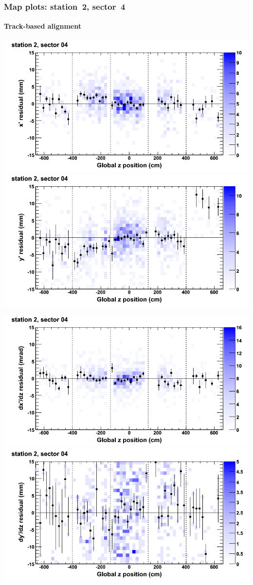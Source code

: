 \documentclass[compress]{beamer}
\begin{document}
\begin{frame}
\frametitle{Map plots: station~2, sector~4}
\framesubtitle{Track-based alignment}
\includegraphics[width=0.5\linewidth]{mapplots_re05/DTvsz_st2sec04_x.png}
\includegraphics[width=0.5\linewidth]{mapplots_re05/DTvsz_st2sec04_y.png}

\includegraphics[width=0.5\linewidth]{mapplots_re05/DTvsz_st2sec04_dxdz.png}
\includegraphics[width=0.5\linewidth]{mapplots_re05/DTvsz_st2sec04_dydz.png}
\end{frame}
\end{document}
